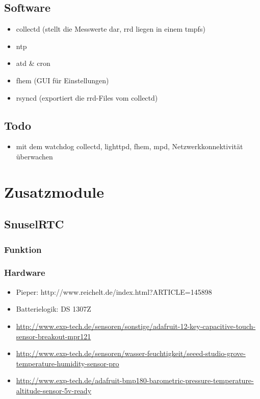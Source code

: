 \documentclass[a4paper,twoside,titlepage,normalheadings,tocleft,bibtotoc]{scrartcl}
\begin{document}
\subsection{Software}
\begin{itemize}
\item collectd (stellt die Messwerte dar, rrd liegen in einem tmpfs)
\item ntp
\item atd \& cron
\item fhem (GUI für Einstellungen)
\item rsyncd (exportiert die rrd-Files vom collectd)
\end{itemize}
\subsection{Todo}
\begin{itemize}
\item mit dem watchdog collectd, lighttpd, fhem, mpd, Netzwerkkonnektivität überwachen
\end{itemize}
\section{Zusatzmodule}
\subsection{SnuselRTC}
\subsubsection{Funktion}
\subsubsection{Hardware}
\begin{itemize}
\item Pieper: http://www.reichelt.de/index.html?ARTICLE=145898
\item Batterielogik: DS 1307Z
\item \url{http://www.exp-tech.de/sensoren/sonstige/adafruit-12-key-capacitive-touch-sensor-breakout-mpr121}
\item \url{http://www.exp-tech.de/sensoren/wasser-feuchtigkeit/seeed-studio-grove-temperature-humidity-sensor-pro}
\item \url{http://www.exp-tech.de/adafruit-bmp180-barometric-pressure-temperature-altitude-sensor-5v-ready}
\end{itemize}
\end{document}
